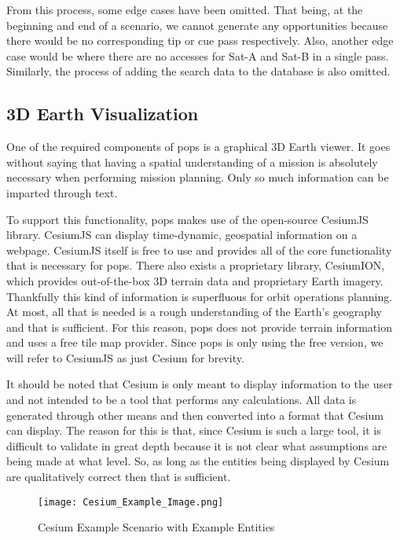 From this process, some edge cases have been omitted. That being, at the
beginning and end of a scenario, we cannot generate any opportunities because
there would be no corresponding tip or cue pass respectively. Also, another
edge case would be where there are no accesses for Sat-A and Sat-B in a single
pass. Similarly, the process of adding the search data to the database is also
omitted.


\subsection{3D Earth Visualization}

One of the required components of \gls{pops} is a graphical 3D Earth viewer.
It goes without saying that having a spatial understanding of a mission is
absolutely necessary when performing mission planning. Only so much information
can be imparted through text.


To support this functionality, \gls{pops} makes use of the open-source CesiumJS
library. CesiumJS can display time-dynamic, geospatial information on a
webpage. CesiumJS itself is free to use and provides all of the core
functionality that is necessary for \gls{pops}. There also exists a proprietary
library, CesiumION, which provides out-of-the-box 3D terrain data and
proprietary Earth imagery. Thankfully this kind of information is superfluous
for orbit operations planning. At most, all that is needed is a rough
understanding of the Earth's geography and that is sufficient. For this reason,
\gls{pops} does not provide terrain information and uses a free tile map
provider. Since \gls{pops} is only using the free version, we will refer to
CesiumJS as just Cesium for brevity. 

It should be noted that Cesium is only meant to display information to the user
and not intended to be a tool that performs any calculations. All data is generated
through other means and then converted into a format that Cesium can display.
The reason for this is that, since Cesium is such a large tool, it is difficult
to validate in great depth because it is not clear what assumptions are being
made at what level. So, as long as the entities being displayed by Cesium are
qualitatively correct then that is sufficient.

\begin{figure}[h]
    \centering
    \texttt{[image: Cesium\_Example\_Image.png]} 
    \caption{Cesium Example Scenario with Example Entities}
    \label{fig:example_cesium}
\end{figure}

